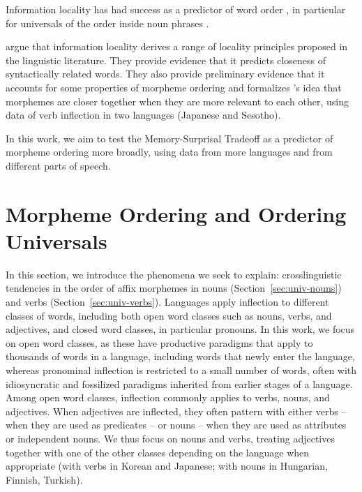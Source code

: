 \documentclass[11pt,letterpaper]{article}
\newcommand{\citep}{\parencite}
\newcommand{\citet}{\Textcite}
\newcommand{\jd}[1]{\textcolor{Pink}{[jd: #1]}}
\begin{document}
Information locality has had success as a predictor of word order \citep{futrell2019information}, in particular for universals of the order inside noun phrases \citep{culbertson2020from,hahn-information-theoretic-2018,DBLP:conf/acl/FutrellDS20}.



\citet{Hahn2020modeling} argue that information locality derives a range of locality principles proposed in the linguistic literature.
They provide evidence that it predicts closeness of syntactically related words.
They also provide preliminary evidence that it accounts for some properties of morpheme ordering and formalizes \cite{bybee-morphology-1985}'s idea that morphemes are closer together when they are more relevant to each other, using data of verb inflection in two languages (Japanese and Sesotho).



In this work, we aim to test the Memory-Surprisal Tradeoff as a predictor of morpheme ordering more broadly, using data from more languages and from different parts of speech.



\section{Morpheme Ordering and Ordering Universals}


In this section, we introduce the phenomena we seek to explain: crosslinguistic tendencies in the order of affix morphemes in nouns (Section~\ref{sec:univ-nouns}) and verbs (Section~\ref{sec:univ-verbs}).
Languages apply inflection to different classes of words, including both open word classes such as nouns, verbs, and adjectives, and closed word classes, in particular pronouns.
In this work, we focus on open word classes, as these have productive paradigms that apply to thousands of words in a language, including words that newly enter the language, whereas pronominal inflection is restricted to a small number of words, often with idiosyncratic and fossilized paradigms inherited from earlier stages of a language.
Among open word classes, inflection commonly applies to verbs, nouns, and adjectives.
When adjectives are inflected, they often pattern with either verbs -- when they are used as predicates -- or nouns -- when they are used as attributes or independent nouns.
We thus focus on nouns and verbs, treating adjectives together with one of the other classes depending on the language when appropriate (with verbs in Korean and Japanese; with nouns in Hungarian, Finnish, Turkish).
\end{document}
